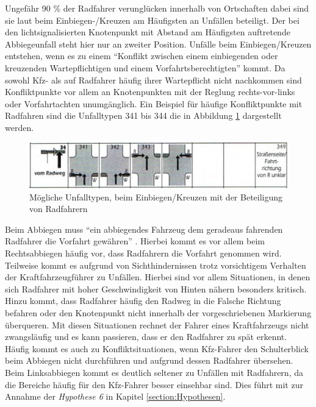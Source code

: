 Ungefähr 90 \% \parencite[S. 10]{Below.2016} der Radfahrer verunglücken innerhalb von Ortschaften dabei sind sie laut \Textcite[S. 303]{Schreiber.2014b} beim Einbiegen-/Kreuzen am Häufigsten an Unfällen beteiligt. Der bei den lichtsignalisierten Knotenpunkt mit Abstand am Häufigsten auftretende Abbiegeunfall steht hier nur an zweiter Position. Unfälle beim Einbiegen/Kreuzen entstehen, wenn es zu einem \enquote{Konflikt zwischen einem einbiegenden oder kreuzenden Wartepflichtigen und einem Vorfahrtsberechtigten} \parencite[S. 12]{GesamtverbandderDeutschenVersicherungswirtschafte.V..2016} kommt. Da sowohl \ac{Kfz}- als auf Radfahrer häufig ihrer Wartepflicht nicht nachkommen sind Konfliktpunkte vor allem an Knotenpunkten mit der Reglung rechts-vor-links oder Vorfahrtachten unumgänglich. Ein Beispiel für häufige Konfliktpunkte mit Radfahren sind die Unfalltypen 341 bis 344 die in Abbildung \ref{fig:Einbiege-Unfall_Rad} dargestellt werden.

\begin{savenotes}
	\begin{figure}[H]
		\centering
		\includegraphics[width=13cm,height=2cm]{figures/Einbiege-Unfall_Rad}
		\caption[Unfalltyp 3 Einbiegen/Kreuzen-Unfall mit Radfarerbeteiligung]{Mögliche Unfalltypen, beim Einbiegen/Kreuzen mit der Beteiligung von Radfahrern \parencite[S. 13]{GesamtverbandderDeutschenVersicherungswirtschafte.V..2016}}\label{fig:Einbiege-Unfall_Rad}
	\end{figure}
\end{savenotes}

Beim Abbiegen muss \enquote{ein abbiegendes Fahrzeug dem geradeaus fahrenden Radfahrer die Vorfahrt gewähren} \parencite[S. 303]{Schreiber.2014b}. Hierbei kommt es vor allem beim Rechtsabbiegen häufig vor, dass Radfahrern die Vorfahrt genommen wird. Teilweise kommt es aufgrund von Sichthindernissen trotz vorsichtigem Verhalten der Kraftfahrzeugführer zu Unfällen. Hierbei sind vor allem Situationen, in denen sich Radfahrer mit hoher Geschwindigkeit von Hinten nähern besonders kritisch. Hinzu kommt, dass Radfahrer häufig den Radweg in die Falsche Richtung befahren oder den Knotenpunkt nicht innerhalb der vorgeschriebenen Markierung überqueren. Mit diesen Situationen rechnet der Fahrer eines Kraftfahrzeugs nicht zwangsläufig und es kann passieren, dass er den Radfahrer zu spät erkennt. Häufig kommt es auch zu Konfliktsituationen, wenn Kfz-Fahrer den Schulterblick beim Abbiegen nicht durchführen und aufgrund dessen Radfahrer übersehen. Beim Linksabbiegen kommt es deutlich seltener zu Unfällen mit Radfahrern, da die Bereiche häufig für den Kfz-Fahrer besser einsehbar sind. Dies führt mit zur Annahme der \textit{Hypothese 6} in Kapitel \ref{section:Hypothesen}.

